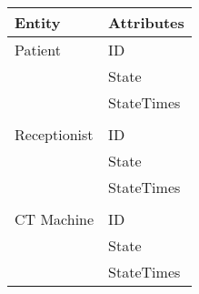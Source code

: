 \begin{tabular}{ll}
\toprule
Entity  & Attributes        \\ \midrule
Patient & ID                \\
        & State             \\
        & StateTimes       \\
        &                   \\
Receptionist   & ID                \\
        & State             \\
        & StateTimes       \\
        &                   \\
CT Machine  & ID                \\
        & State             \\
        & StateTimes       \\ \bottomrule
\end{tabular}
